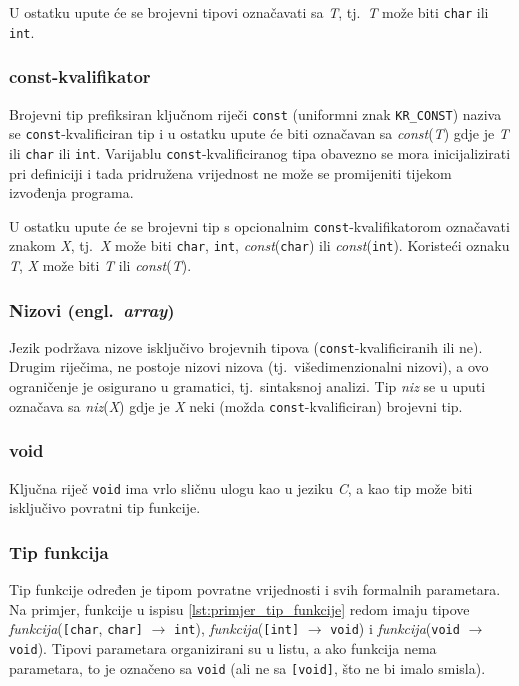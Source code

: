 \documentclass[times, 12pt, utf8]{book}
\begin{document}
U ostatku upute će se brojevni tipovi označavati sa \emph{T}, tj.~\emph{T} može biti \verb|char| ili \verb|int|.

\subsubsection{const-kvalifikator}
Brojevni tip prefiksiran ključnom riječi \verb|const| (uniformni znak \verb|KR_CONST|) naziva se \verb|const|-kvalificiran tip i u ostatku upute će biti označavan sa \emph{const}(\emph{T}) gdje je \emph{T} ili \verb|char| ili \verb|int|.
Varijablu \verb|const|-kvalificiranog tipa obavezno se mora inicijalizirati pri definiciji i tada pridružena vrijednost ne može se promijeniti tijekom izvođenja programa.

U ostatku upute će se brojevni tip s opcionalnim \verb|const|-kvalifikatorom označavati znakom \emph{X}, tj.~\emph{X} može biti \verb|char|, \verb|int|, \emph{const}(\verb|char|) ili \emph{const}(\verb|int|).
Koristeći oznaku \emph{T}, \emph{X} može biti \emph{T} ili \emph{const}(\emph{T}).

\subsubsection{Nizovi (engl.~\emph{array})}
Jezik podržava nizove isključivo brojevnih tipova (\verb|const|-kvalificiranih ili ne).
Drugim riječima, ne postoje nizovi nizova (tj.~višedimenzionalni nizovi), a ovo ograničenje je osigurano u gramatici, tj.~sintaksnoj analizi.
Tip \emph{niz} se u uputi označava sa \emph{niz}(\emph{X}) gdje je \emph{X} neki (možda \verb|const|-kvalificiran) brojevni tip.

\subsubsection{void}
Ključna riječ \verb|void| ima vrlo sličnu ulogu kao u jeziku \emph{C}, a kao tip može biti isključivo povratni tip funkcije.

\subsubsection{Tip funkcija}
Tip funkcije određen je tipom povratne vrijednosti i svih formalnih parametara.
Na primjer, funkcije u ispisu \ref{lst:primjer_tip_funkcije} redom imaju tipove \emph{funkcija}(\verb|[char|, \verb|char]| \(\to\) \verb|int|), \emph{funkcija}(\verb|[int]| \(\to\) \verb|void|) i \emph{funkcija}(\verb|void| \(\to\) \verb|void|).
Tipovi parametara organizirani su u listu, a ako funkcija nema parametara, to je označeno sa \verb|void| (ali ne sa \verb|[void]|, što ne bi imalo smisla).
\end{document}

